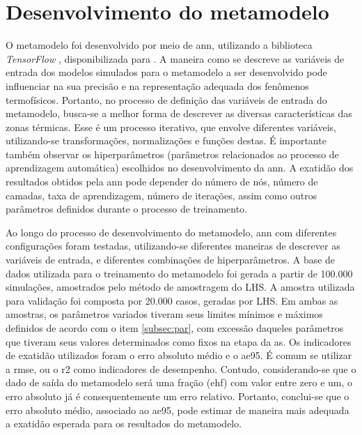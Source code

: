 \documentclass[brazil,hardcopy,openany]{ufscthesis} %
\begin{document}
\section{Desenvolvimento do metamodelo}

O metamodelo foi desenvolvido por meio de \acrfull{ann}, utilizando a biblioteca \textit{TensorFlow} \cite{tensorflow2015}, disponibilizada para .
A maneira como se descreve as variáveis de entrada dos modelos simulados para o metamodelo a ser desenvolvido pode influenciar na sua precisão e na representação adequada dos fenômenos termofísicos.
Portanto, no processo de definição das variáveis de entrada do metamodelo, busca-se a melhor forma de descrever as diversas características das zonas térmicas.
Esse é um processo iterativo, que envolve diferentes variáveis, utilizando-se transformações, normalizações e funções destas. 
É importante também observar os hiperparâmetros (parâmetros relacionados ao processo de aprendizagem automática) escolhidos no desenvolvimento da \acrshort{ann}. 
A exatidão dos resultados obtidos pela \acrshort{ann} pode depender do número de nós, número de camadas, taxa de aprendizagem, número de iterações, assim como outros parâmetros definidos durante o processo de treinamento. 

Ao longo do processo de desenvolvimento do metamodelo, \acrshort{ann} com diferentes configurações foram testadas, utilizando-se diferentes maneiras de descrever as variáveis de entrada, e diferentes combinações de hiperparâmetros.
A base de dados utilizada para o treinamento do metamodelo foi gerada a partir de 100.000 simulações, amostrados pelo método de amostragem do LHS. %
A amostra utilizada para validação foi composta por 20.000 casos, geradas por LHS.
Em ambas as amostras, os parâmetros variados tiveram seus limites mínimos e máximos definidos de acordo com o item \ref{subsec:par}, com excessão daqueles parâmetros que tiveram seus valores determinados como fixos na etapa da \acrshort{as}.
Os indicadores de exatidão utilizados foram o erro absoluto médio e o \acrfull{ae95}.
É comum se utilizar a \acrfull{rmse}, ou o \acrfull{r2} como indicadores de desempenho. Contudo, considerando-se que o dado de saída do metamodelo será uma fração (\acrshort{ehf}) com valor entre zero e um, o erro absoluto já é consequentemente um erro relativo. Portanto, conclui-se que o erro absoluto médio, associado ao \acrlong{ae95}, pode estimar de maneira mais adequada a exatidão esperada para os resultados do metamodelo.
\end{document}
